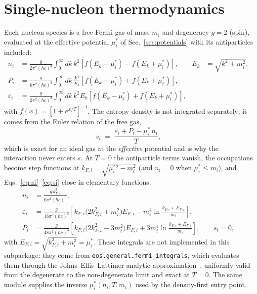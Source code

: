 \documentclass[aps,prc,onecolumn,superscriptaddress,nofootinbib,10pt]{revtex4-2}
\newcommand{\mueff}[1]{\mu^{*}_{#1}}
\begin{document}
\section{Single-nucleon thermodynamics}
\label{sec:kinetic}

Each nucleon species is a free Fermi gas of mass $m_i$ and degeneracy $g = 2$
(spin), evaluated at the effective potential $\mueff{i}$ of
Sec.~\ref{sec:potentials} with its antiparticles included:
%
\begin{align}
n_i &= \frac{g}{2\pi^2 (\hbar c)^3} \int_0^\infty \! dk\, k^2
       \left[ f(E_k - \mueff{i}) - f(E_k + \mueff{i}) \right] ,
       & E_k &= \sqrt{k^2 + m_i^2} ,
\label{eq:ni} \\
P_i &= \frac{g}{6\pi^2 (\hbar c)^3} \int_0^\infty \! dk\, \frac{k^4}{E_k}
       \left[ f(E_k - \mueff{i}) + f(E_k + \mueff{i}) \right] ,
\label{eq:Pi} \\
\varepsilon_i &= \frac{g}{2\pi^2 (\hbar c)^3} \int_0^\infty \! dk\, k^2 E_k
       \left[ f(E_k - \mueff{i}) + f(E_k + \mueff{i}) \right] ,
\label{eq:epsi}
\end{align}
%
with $f(x) = [1 + e^{x/T}]^{-1}$. The entropy density is not integrated
separately; it comes from the Euler relation of the free gas,
%
\begin{equation}
s_i \;=\; \frac{\varepsilon_i + P_i - \mueff{i}\, n_i}{T} ,
\label{eq:si}
\end{equation}
%
which is exact for an ideal gas at the \emph{effective} potential and is why
the interaction never enters $s$. At $T = 0$ the antiparticle terms vanish,
the occupations become step functions at
$k_{F,i} = \sqrt{\mueff{i}{}^2 - m_i^2}$ (and $n_i = 0$ when
$\mueff{i} \le m_i$), and Eqs.~\eqref{eq:ni}--\eqref{eq:si} close in
elementary functions:
%
\begin{align}
n_i &= \frac{g\, k_{F,i}^3}{6\pi^2 (\hbar c)^3} , \\
\varepsilon_i &= \frac{g}{16 \pi^2 (\hbar c)^3}
   \left[ k_{F,i} \big( 2 k_{F,i}^2 + m_i^2 \big) E_{F,i}
        - m_i^4 \ln \frac{k_{F,i} + E_{F,i}}{m_i} \right] , \\
P_i &= \frac{g}{48 \pi^2 (\hbar c)^3}
   \left[ k_{F,i} \big( 2 k_{F,i}^2 - 3 m_i^2 \big) E_{F,i}
        + 3 m_i^4 \ln \frac{k_{F,i} + E_{F,i}}{m_i} \right] ,
\qquad s_i = 0 ,
\end{align}
%
with $E_{F,i} = \sqrt{k_{F,i}^2 + m_i^2} = \mueff{i}$. These integrals are not
implemented in this subpackage: they come from
\texttt{eos.general.fermi\_integrals}, which evaluates them through the
Johns--Ellis--Lattimer analytic approximation~\cite{JohnsEllisLattimer1996},
uniformly valid from the degenerate to the non-degenerate limit and exact at
$T = 0$. The same module supplies the inverse $\mueff{i}(n_i, T, m_i)$ used by
the density-first entry point.
\end{document}
